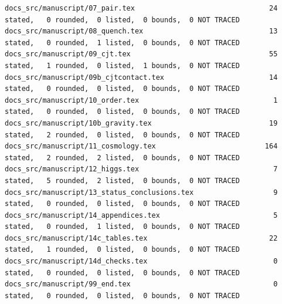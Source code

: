 \documentclass[
  10pt,
]{article}
\begin{document}
\begin{verbatim}
docs_src/manuscript/07_pair.tex                                24 stated,   0 rounded,  0 listed,  0 bounds,  0 NOT TRACED
docs_src/manuscript/08_quench.tex                              13 stated,   0 rounded,  1 listed,  0 bounds,  0 NOT TRACED
docs_src/manuscript/09_cjt.tex                                 55 stated,   1 rounded,  0 listed,  1 bounds,  0 NOT TRACED
docs_src/manuscript/09b_cjtcontact.tex                         14 stated,   0 rounded,  0 listed,  0 bounds,  0 NOT TRACED
docs_src/manuscript/10_order.tex                                1 stated,   0 rounded,  0 listed,  0 bounds,  0 NOT TRACED
docs_src/manuscript/10b_gravity.tex                            19 stated,   2 rounded,  0 listed,  0 bounds,  0 NOT TRACED
docs_src/manuscript/11_cosmology.tex                          164 stated,   2 rounded,  2 listed,  0 bounds,  0 NOT TRACED
docs_src/manuscript/12_higgs.tex                                7 stated,   5 rounded,  2 listed,  0 bounds,  0 NOT TRACED
docs_src/manuscript/13_status_conclusions.tex                   9 stated,   0 rounded,  0 listed,  0 bounds,  0 NOT TRACED
docs_src/manuscript/14_appendices.tex                           5 stated,   0 rounded,  1 listed,  0 bounds,  0 NOT TRACED
docs_src/manuscript/14c_tables.tex                             22 stated,   1 rounded,  0 listed,  0 bounds,  0 NOT TRACED
docs_src/manuscript/14d_checks.tex                              0 stated,   0 rounded,  0 listed,  0 bounds,  0 NOT TRACED
docs_src/manuscript/99_end.tex                                  0 stated,   0 rounded,  0 listed,  0 bounds,  0 NOT TRACED


\end{verbatim}
\end{document}
